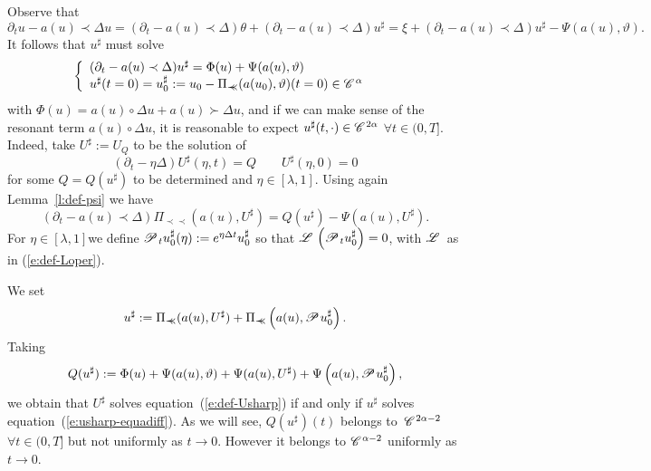 \documentclass[11pt,reqno]{amsart}
\newcommand{\assign}{:=}
\newcommand{\cdummy}{\cdot}
\newcommand{\precprec}{\prec\!\!\!\prec}
\newcommand{\CC}{\mathscr{C} \hspace{.1em}}
\newcommand{\LL}{\mathscr{L} \hspace{.2em}}
\newcommand{\PP}{\mathscr{P} \hspace{.1em}}
\begin{document}
Observe that
\[ \partial_t u - a (u) \prec \Delta u = (\partial_t - a (u) \prec \Delta)
   \theta + (\partial_t - a (u) \prec \Delta) u^{\sharp} = \xi + (\partial_t -
   a (u) \prec \Delta) u^{\sharp} - \Psi (a (u), \vartheta) . \]
It follows that $u^{\sharp}$ must solve
\begin{equation}
  \left\{ \begin{array}{l}
    (\partial_t - a (u) \prec \Delta) u^{\sharp} = \Phi (u) + \Psi (a (u),
    \vartheta)\\
    u^{\sharp} (t = 0) = u^{\sharp}_0 \assign u_0 - \Pi_{\precprec} (a (u_0),
    \vartheta) (t = 0) \in \CC^{\alpha}
  \end{array} \right. \label{e:usharp-equadiff} \qquad
\end{equation}
with $\Phi (u) = a (u) \circ \Delta u + a (u) \succ \Delta u$, and if we can
make sense of the resonant term $a (u) \circ \Delta u$, it is reasonable to
expect $u^{\sharp} (t, \cdummy) \in \CC^{2 \alpha}$ $\forall t \in (0, T]$.
Indeed, take $U^{\sharp} \assign U_Q$ to be the solution of
\begin{equation}
  (\partial_t - \eta \Delta) U^{\sharp} (\eta, t) = Q \qquad U^{\sharp} (\eta,
  0) = 0 \label{e:def-Usharp} 
\end{equation}
for some $Q = Q (u^{\sharp})$ to be determined and $\eta \in [\lambda, 1]$.
Using again Lemma~\ref{l:def-psi} we have
\[ (\partial_t - a (u) \prec \Delta) \Pi_{\precprec} (a (u), U^{\sharp}) = Q
   (u^{\sharp}) - \Psi (a (u), U^{\sharp}) . \]
For $\eta \in [\lambda, 1] $we define $\PP_t u_0^{\sharp} (\eta) \assign
e^{\eta \Delta t} u_0^{\sharp}$ so that $\LL \left( \PP_t u_0^{\sharp} \right)
= 0$, with $\LL$ as in (\ref{e:def-Loper}).

We set
\begin{equation}
  u^{\sharp} \assign \Pi_{\precprec} (a (u), U^{\sharp}) + \Pi_{\precprec}
  \left( a (u), \PP u_0^{\sharp} \right) . \label{eq:decomp-sharp}
\end{equation}
Taking
\[ Q (u^{\sharp}) : = \Phi (u) + \Psi (a (u), \vartheta) + \Psi (a (u),
   U^{\sharp}) + \Psi \left( a (u), \PP u_0^{\sharp} \right), \]
we obtain that $U^{\sharp}$ solves equation~(\ref{e:def-Usharp}) if and only
if $u^{\sharp}$ solves equation~(\ref{e:usharp-equadiff}). As we will see, $Q
(u^{\sharp}) (t)$ belongs to~$\CC^{2 \alpha - 2}$ $\forall t \in (0, T]$ but
not uniformly as $t \rightarrow 0$. However it belongs to $\CC^{\alpha - 2}$
uniformly as $t \rightarrow 0$.
\end{document}
